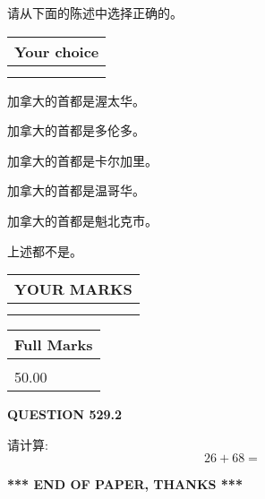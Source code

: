 \documentclass{ctexart}
\begin{document}
  
请从下面的陈述中选择正确的。
  
  
\noindent\hspace{3.0in} \begin{tabular}{|l|}
\hline
Your choice \\
\hline
 \\ 
 \\ 
\hline
\end{tabular}
  
  
 
 
加拿大的首都是渥太华。
 
 
加拿大的首都是多伦多。
 
 
加拿大的首都是卡尔加里。
 
 
加拿大的首都是温哥华。
 
 
加拿大的首都是魁北克市。
 
 
 上述都不是。
 
 
  
\vspace{0.2in}
  
\noindent\begin{tabular}{|l|}
\hline
 YOUR MARKS  \\
\hline
 \\ 
 \\ 
\hline
\end{tabular}
\hspace{0.05in} \begin{tabular}{|l|}
\hline
 Full Marks  \\
\hline
 \\ 
50.00 \\
\hline
\end{tabular}
{\textbf{\Large{QUESTION
529.2 
}}}
  
  
 
请计算:
\begin{equation}
26 +  %
68 = \nonumber
\end{equation}
 

 

 
   
   
 \vspace{0.2in}
 
   
   
   
   
\vspace{1.0in} 
{\textbf{\large{ *** END OF PAPER, THANKS *** }}} 
   
\end{document}
